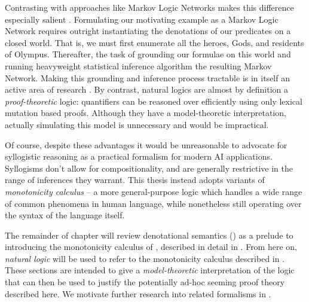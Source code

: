 Contrasting with approaches like Markov Logic Networks makes this difference especially salient
  \cite{key:2006richardson-mln}.
Formulating our motivating example as a Markov Logic Network requires outright instantiating
  the denotations of our predicates on a closed world.
That is, we must first enumerate all the heroes, Gods, and residents of Olympus.
Thereafter, the task of grounding our formulae on this world and running heavyweight
  statistical inference algorithm the resulting Markov Network.
Making this grounding and inference process tractable is in itself an active area of
  research \cite{key:2011niu-tuffy,key:2014zhang-dimmwitted}.
By contrast, natural logics are almost by definition a \textit{proof-theoretic} logic:
  quantifiers can be reasoned over efficiently using only lexical mutation based proofs.
Although they have a model-theoretic interpretation, actually simulating this model
  is unnecessary and would be impractical.


Of course, despite these advantages it would be unreasonable to advocate for syllogistic
  reasoning as a practical formalism for modern AI applications.
Syllogisms don't allow for compositionality, and are generally restrictive in
  the range of inferences they warrant.
This thesis instead adopts variants of \textit{monotonicity calculus}
  \cite{key:1986benthem-natlog,key:1991valencia-natlog}
  -- a more general-purpose logic which handles a wide range of common phenomena in human
  language, while nonetheless still operating over the syntax of the language itself.


%
%
The remainder of chapter will review denotational semantics ()
  as a prelude to introducing the monotonicity calculus of ,
  described in detail in .
From here on, \textit{natural logic} will be used to refer to the monotonicity calculus
  described in .
These sections are intended to give a \textit{model-theoretic} interpretation of the logic
  that can then be used to justify the potentially ad-hoc seeming proof theory described
  here.
We motivate further research into related formalisms in .

